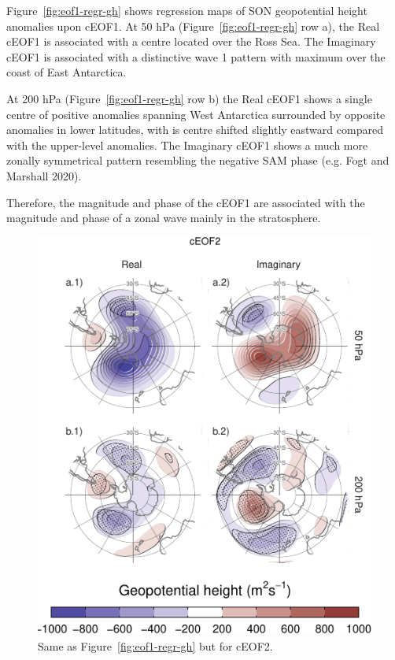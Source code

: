 \documentclass[smallextended]{svjour3}       %
\begin{document}
Figure~\ref{fig:eof1-regr-gh} shows regression maps of SON geopotential height anomalies upon cEOF1.
At 50 hPa (Figure~\ref{fig:eof1-regr-gh} row a), the Real cEOF1 is associated with a centre located over the Ross Sea.
The Imaginary cEOF1 is associated with a distinctive wave 1 pattern with maximum over the coast of East Antarctica.

At 200 hPa (Figure~\ref{fig:eof1-regr-gh} row b) the Real cEOF1 shows a single centre of positive anomalies spanning West Antarctica surrounded by opposite anomalies in lower latitudes, with is centre shifted slightly eastward compared with the upper-level anomalies.
The Imaginary cEOF1 shows a much more zonally symmetrical pattern resembling the negative SAM phase (e.g. Fogt and Marshall 2020).

Therefore, the magnitude and phase of the cEOF1 are associated with the magnitude and phase of a zonal wave mainly in the stratosphere.



\begin{figure}
\centering
\includegraphics{../figures/eof2-regr-gh-1.pdf}
\caption{\label{fig:eof2-regr-gh}Same as Figure~\ref{fig:eof1-regr-gh} but for cEOF2.}
\end{figure}
\end{document}
